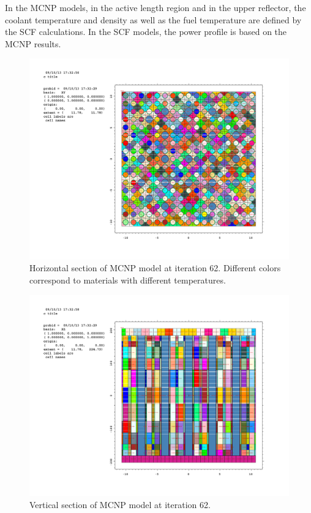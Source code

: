\documentclass[a4paper,10pt,twocolumn,english]{sphinxsnamc2013}
\begin{document}
In the MCNP models, in the active length region and in the upper reflector, the
coolant temperature and density as well as the fuel temperature are defined by
the SCF calculations. In the SCF models, the power profile is based on the MCNP
results.
\begin{figure}[htbp]
\centering
\capstart

\includegraphics{i__p01.pdf}
\caption{Horizontal section of MCNP model at iteration 62. Different colors
correspond to materials with different temperatures.
\label{pic:hor}}\end{figure}
\begin{figure}[htbp]
\centering
\capstart

\includegraphics{i__p021.pdf}
\caption{Vertical section of MCNP model at iteration 62. \label{pic:ver}}\end{figure}
\end{document}
